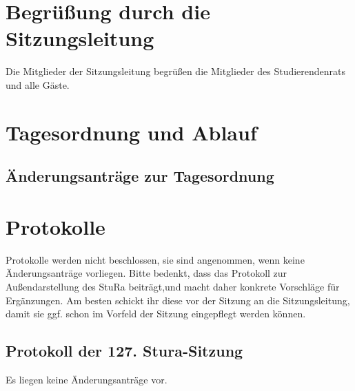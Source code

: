 \section{Begrüßung durch die Sitzungsleitung}
Die Mitglieder  der  Sitzungsleitung begrüßen die  Mitglieder  des  Studierendenrats  und  alle Gäste.

\section{Tagesordnung und Ablauf}
\hypersetup{linkcolor=black}%
\tableofcontents
\hypersetup{linkcolor=blue}%
\subsection{Änderungsanträge zur Tagesordnung}

\section{Protokolle}
Protokolle werden nicht beschlossen, sie sind angenommen, wenn keine Änderungsanträge vorliegen.
Bitte bedenkt, dass das Protokoll zur Außendarstellung des StuRa beiträgt,und macht daher konkrete Vorschläge
für Ergänzungen. Am besten schickt ihr diese vor der Sitzung an die Sitzungsleitung, damit sie ggf. schon im 
Vorfeld der Sitzung eingepflegt werden können.
\subsection{Protokoll der 127. Stura-Sitzung}
Es liegen keine Änderungsanträge vor.